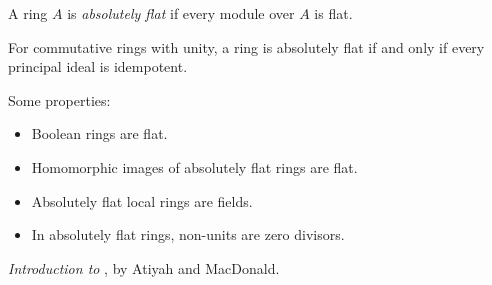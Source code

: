 \documentclass[12pt]{article}
\newcommand{\<}{\langle}
\renewcommand{\>}{\rangle}
\begin{document}
A ring $A$ is \emph{absolutely flat} if every module over $A$ is flat.

For commutative rings with unity, a ring is absolutely flat if and only if every principal ideal is idempotent.

Some properties:

\begin{itemize}
\item Boolean rings are flat.
\item Homomorphic images of absolutely flat rings are flat.
\item Absolutely flat local rings are fields.
\item In absolutely flat rings, non-units are zero divisors.
\end{itemize}


\begin{thebibliography}{9}
 \emph{Introduction to }, by Atiyah and MacDonald.
\end{thebibliography}
\end{document}
